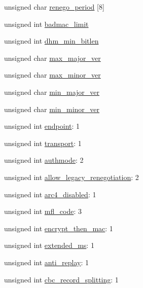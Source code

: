 \begin{DoxyCompactItemize}
unsigned char \hyperlink{structmbedtls__ssl__config_ab1e7273cb7a477f5cb303134055555b0}{renego\-\_\-period} \mbox{[}8\mbox{]}
\item 
unsigned int \hyperlink{structmbedtls__ssl__config_ab61653cfcc80cc9d0d902705212c6e4e}{badmac\-\_\-limit}
\item 
unsigned int \hyperlink{structmbedtls__ssl__config_abba2011a713a2afab2cf724c21f11efb}{dhm\-\_\-min\-\_\-bitlen}
\item 
unsigned char \hyperlink{structmbedtls__ssl__config_a10a7ca31f5096d71fc9effbe004d3fd8}{max\-\_\-major\-\_\-ver}
\item 
unsigned char \hyperlink{structmbedtls__ssl__config_a5cd10b5cbe18392c64fa6831cb222243}{max\-\_\-minor\-\_\-ver}
\item 
unsigned char \hyperlink{structmbedtls__ssl__config_ae349313f286e0e79d21d18fe40fba06f}{min\-\_\-major\-\_\-ver}
\item 
unsigned char \hyperlink{structmbedtls__ssl__config_a61579a80f1aa272cc8d9f7c2786b7b30}{min\-\_\-minor\-\_\-ver}
\item 
unsigned int \hyperlink{structmbedtls__ssl__config_a7ee72d610d141b932141bf8afb3aec2a}{endpoint}\-: 1
\item 
unsigned int \hyperlink{structmbedtls__ssl__config_a63cafd8d131ac7d162406b47bc6565d0}{transport}\-: 1
\item 
unsigned int \hyperlink{structmbedtls__ssl__config_a0d3c2ea8eaf59a5acfcdb6b123148c1f}{authmode}\-: 2
\item 
unsigned int \hyperlink{structmbedtls__ssl__config_afcd4e0685b3fca3c49043bdd6a84490f}{allow\-\_\-legacy\-\_\-renegotiation}\-: 2
\item 
unsigned int \hyperlink{structmbedtls__ssl__config_a7155fd95a3206146ef1374341d008e92}{arc4\-\_\-disabled}\-: 1
\item 
unsigned int \hyperlink{structmbedtls__ssl__config_a67e52d2668c7f4bc4f6a872c35a679ab}{mfl\-\_\-code}\-: 3
\item 
unsigned int \hyperlink{structmbedtls__ssl__config_a8f9e666cb46e055bed2b799a94a85e3e}{encrypt\-\_\-then\-\_\-mac}\-: 1
\item 
unsigned int \hyperlink{structmbedtls__ssl__config_ac6ac2c30ac20fc9033913e0de6ffbe93}{extended\-\_\-ms}\-: 1
\item 
unsigned int \hyperlink{structmbedtls__ssl__config_af636d34975cc5ced1aa32cb424a37c67}{anti\-\_\-replay}\-: 1
\item 
unsigned int \hyperlink{structmbedtls__ssl__config_a053c327dda99451c6e82cda73e27d322}{cbc\-\_\-record\-\_\-splitting}\-: 1

\end{DoxyCompactItemize}
